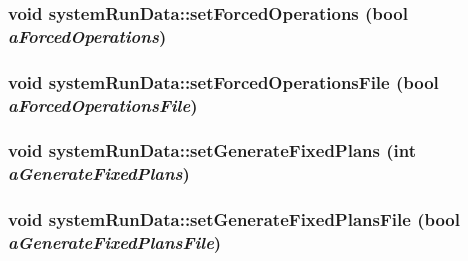 \label{classsystem_run_data_a3b7cd49bc1630a54ae34102205475e9b}
\hypertarget{classsystem_run_data_af3adb9907a5ce5634edbc3ada17c977a}{
\subsubsection[{setForcedOperations}]{\setlength{\rightskip}{0pt plus 5cm}void systemRunData::setForcedOperations (bool {\em aForcedOperations})}}
\label{classsystem_run_data_af3adb9907a5ce5634edbc3ada17c977a}
\hypertarget{classsystem_run_data_ababaace17d2cf77459e8849e24468c3d}{
\subsubsection[{setForcedOperationsFile}]{\setlength{\rightskip}{0pt plus 5cm}void systemRunData::setForcedOperationsFile (bool {\em aForcedOperationsFile})}}
\label{classsystem_run_data_ababaace17d2cf77459e8849e24468c3d}
\hypertarget{classsystem_run_data_a32e0a5750f39fa2fab1af0add1d5af0d}{
\subsubsection[{setGenerateFixedPlans}]{\setlength{\rightskip}{0pt plus 5cm}void systemRunData::setGenerateFixedPlans (int {\em aGenerateFixedPlans})}}
\label{classsystem_run_data_a32e0a5750f39fa2fab1af0add1d5af0d}
\hypertarget{classsystem_run_data_a12733d14d75b6d359536b0be5cdac074}{
\subsubsection[{setGenerateFixedPlansFile}]{\setlength{\rightskip}{0pt plus 5cm}void systemRunData::setGenerateFixedPlansFile (bool {\em aGenerateFixedPlansFile})}}
